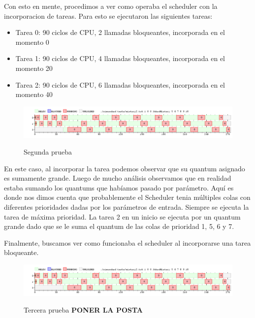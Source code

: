 \pagebreak

Con esto en mente, procedimos a ver como operaba el scheduler con la incorporacion de tareas. Para esto se ejecutaron las siguientes tareas:

\begin{itemize}
	\item Tarea 0: 90 ciclos de CPU, 2 llamadas bloqueantes, incorporada en el momento 0
	\item Tarea 1: 90 ciclos de CPU, 4 llamadas bloqueantes, incorporada en el momento 20
	\item Tarea 2: 90 ciclos de CPU, 6 llamadas bloqueantes, incorporada en el momento 40
\end{itemize}

\begin{figure}[h]
    \includegraphics[width=\linewidth]{images/mist2.png}
    \label{fig:Task Consola}
    \caption{Segunda prueba}
\end{figure}

En este caso, al incorporar la tarea podemos observar que su quantum asignado es sumamente grande. Luego de mucho análisis observamos que en realidad estaba sumando los quantums que habíamos pasado por parámetro. Aquí es donde nos dimos cuenta que probablemente el Scheduler tenia múltiples colas con diferentes prioridades dadas por los parámetros de entrada. Siempre se ejecuta la tarea de máxima prioridad. La tarea 2 en un inicio se ejecuta por un quantum grande dado que se le suma el quantum de las colas de prioridad 1, 5, 6 y 7.

\hspace{1px}

Finalmente, buscamos ver como funcionaba el scheduler al incorporarse una tarea bloqueante.

\begin{figure}[h]
    \includegraphics[width=\linewidth]{images/mist2.png}
    \label{fig:Task Consola}
    \caption{Tercera prueba \textbf{PONER LA POSTA}}
\end{figure}

